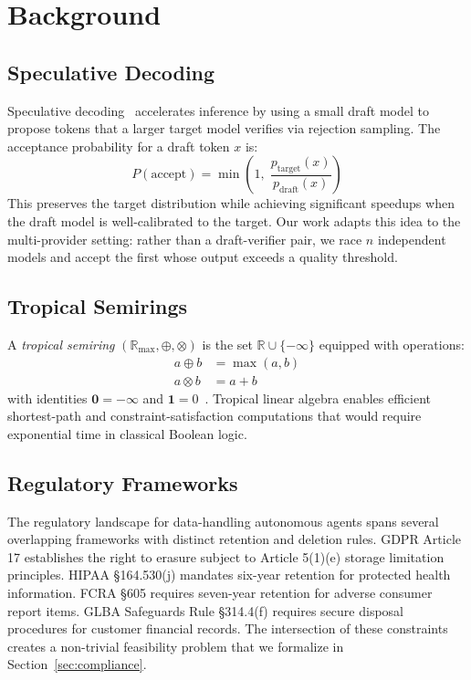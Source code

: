 \documentclass[11pt,twocolumn]{article}
\newcommand{\tplus}{\oplus}
\newcommand{\ttimes}{\otimes}
\newcommand{\R}{\mathbb{R}}
\newcommand{\Rmax}{\R_{\max}}
\begin{document}
\section{Background}

\subsection{Speculative Decoding}

Speculative decoding~\cite{leviathan2023fast,chen2023accelerating} accelerates
inference by using a small draft model to propose tokens that a larger target model
verifies via rejection sampling. The acceptance probability for a draft token $x$ is:
\begin{equation}
  P(\text{accept}) = \min\!\left(1,\; \frac{p_{\text{target}}(x)}{p_{\text{draft}}(x)}\right)
  \label{eq:spec_decode}
\end{equation}
This preserves the target distribution while achieving significant speedups when the
draft model is well-calibrated to the target. Our work adapts this idea to the
multi-provider setting: rather than a draft-verifier pair, we race $n$ independent
models and accept the first whose output exceeds a quality threshold.

\subsection{Tropical Semirings}

A \emph{tropical semiring} $(\Rmax, \tplus, \ttimes)$ is the set $\R \cup \{-\infty\}$
equipped with operations:
\begin{align}
  a \tplus b &= \max(a, b) \\
  a \ttimes b &= a + b
\end{align}
with identities $\mathbf{0} = -\infty$ and $\mathbf{1} = 0$~\cite{maclagan2015introduction}.
Tropical linear algebra enables efficient shortest-path and constraint-satisfaction
computations that would require exponential time in classical Boolean logic.

\subsection{Regulatory Frameworks}

The regulatory landscape for data-handling autonomous agents spans several overlapping
frameworks with distinct retention and deletion rules. GDPR Article 17 establishes the
right to erasure subject to Article 5(1)(e) storage limitation principles. HIPAA
\S164.530(j) mandates six-year retention for protected health information. FCRA \S605
requires seven-year retention for adverse consumer report items. GLBA Safeguards Rule
\S314.4(f) requires secure disposal procedures for customer financial records. The
intersection of these constraints creates a non-trivial feasibility problem that we
formalize in Section~\ref{sec:compliance}.
\end{document}
